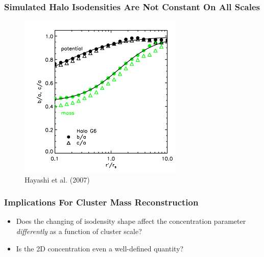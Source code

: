 \documentclass[hyperref={pdfpagelabels=false}]{beamer}
\begin{document}
\begin{frame}
  \frametitle{Simulated Halo Isodensities Are Not Constant On All Scales}
  \begin{figure}
    \includegraphics[width=0.7\textwidth]{hayashi.png}
    \caption{{\tiny Hayashi et al. (2007)}}
  \end{figure}  
\end{frame}

\begin{frame}
\frametitle{Implications For Cluster Mass Reconstruction}
\begin{itemize}
\item Does the changing of isodensity shape affect the concentration parameter
  {\em differently} as a function of cluster scale?
\item Is the 2D concentration even a well-defined quantity?
\end{itemize}
\end{frame}
\end{document}
